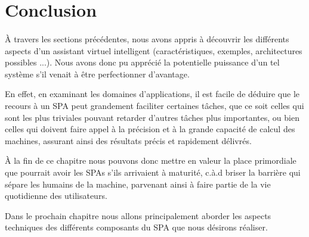 %
\newpage
\section{Conclusion}
\paragraph{}
À travers les sections précédentes, nous avons appris à découvrir les différents aspects d'un assistant virtuel intelligent (caractéristiques, exemples, architectures possibles ...). Nous avons donc pu apprécié la potentielle puissance d'un tel système s'il venait à être perfectionner d'avantage.
\par En effet, en examinant les domaines d'applications, il est facile de déduire que le recours à un SPA peut grandement faciliter certaines tâches, que ce soit celles qui sont les plus triviales pouvant retarder d'autres tâches plus importantes, ou bien celles qui doivent faire appel à la précision et à la grande capacité de calcul des machines, assurant ainsi des résultats précis et rapidement délivrés.
\par
À la fin de ce chapitre nous pouvons donc mettre en valeur la place primordiale que pourrait avoir les SPAs s'ils arrivaient à maturité, c.à.d briser la barrière qui sépare les humains de la machine, parvenant ainsi à faire partie de la vie quotidienne des utilisateurs. 
\par Dans le prochain chapitre nous allons principalement aborder les aspects techniques des différents composants du SPA que nous désirons réaliser.

 
